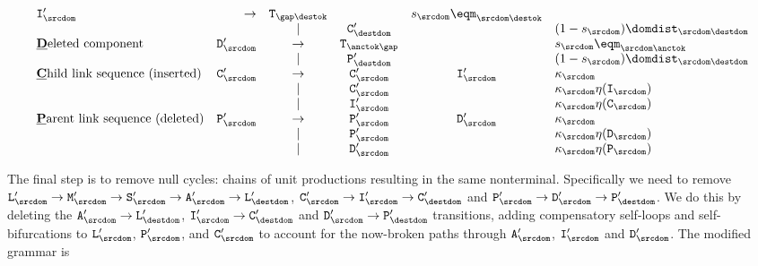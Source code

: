 \[\begin{array}{lrcccl}
\ntins'_\srcdom & \to & \term_{\gap\destok} & & \tok_\srcdom \eqm_{\srcdom\destok} \\
& & | & \ntchild'_\destdom & & (1 - \tok_\srcdom) \domdist_{\srcdom\destdom} \\
\mbox{\underline{\bf D}eleted component} &
\ntdel'_\srcdom & \to & \term_{\anctok\gap} & & \tok_\srcdom \eqm_{\srcdom\anctok} \\
& & | & \ntparent'_\destdom & & (1 - \tok_\srcdom) \domdist_{\srcdom\destdom} \\
\mbox{\underline{\bf C}hild link sequence (inserted)} &
\ntchild'_\srcdom & \to & \ntchild'_\srcdom & \ntins'_\srcdom & \kappa_\srcdom \\
& & | & \ntchild'_\srcdom & & \kappa_\srcdom \nullability(\ntins_\srcdom) \\
& & | & \ntins'_\srcdom & & \kappa_\srcdom \nullability(\ntchild_\srcdom) \\
\mbox{\underline{\bf P}arent link sequence (deleted)} &
\ntparent'_\srcdom & \to & \ntparent'_\srcdom & \ntdel'_\srcdom & \kappa_\srcdom  \\
& & | & \ntparent'_\srcdom & & \kappa_\srcdom \nullability(\ntdel_\srcdom) \\
& & | & \ntdel'_\srcdom & & \kappa_\srcdom \nullability(\ntparent_\srcdom) \\
\end{array}
\]

The final step is to remove null cycles: chains of unit productions resulting in the same nonterminal.
Specifically we need to remove $\ntlinks'_\srcdom\to\ntmor'_\srcdom\to\ntsur'_\srcdom\to\ntaln'_\srcdom\to\ntlinks'_\destdom$,
$\ntchild'_\srcdom\to\ntins'_\srcdom\to\ntchild'_\destdom$ and $\ntparent'_\srcdom\to\ntdel'_\srcdom\to\ntparent'_\destdom$.
We do this by deleting the $\ntaln'_\srcdom\to\ntlinks'_\destdom$, $\ntins'_\srcdom\to\ntchild'_\destdom$ and $\ntdel'_\srcdom\to\ntparent'_\destdom$
transitions, adding compensatory self-loops and self-bifurcations to $\ntlinks'_\srcdom$, $\ntparent'_\srcdom$, and $\ntchild'_\srcdom$
to account for the now-broken paths through $\ntaln'_\srcdom$, $\ntins'_\srcdom$ and $\ntdel'_\srcdom$.
The modified grammar is

